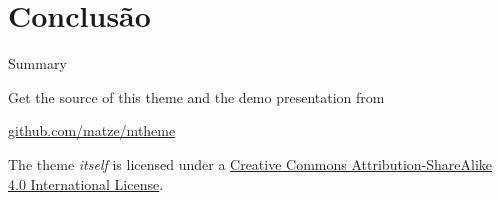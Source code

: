 \documentclass[10pt, compress]{beamer}
\begin{document}
\section{Conclusão}

\begin{frame}{Summary}

  Get the source of this theme and the demo presentation from

  \begin{center}\url{github.com/matze/mtheme}\end{center}

  The theme \emph{itself} is licensed under a
  \href{http://creativecommons.org/licenses/by-sa/4.0/}{Creative Commons
  Attribution-ShareAlike 4.0 International License}.

  \begin{center}\ccbysa\end{center}

\end{frame}


\end{document}
